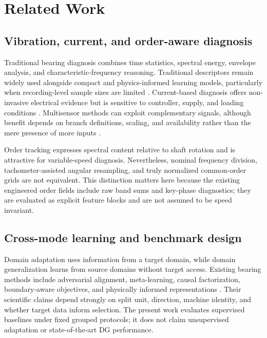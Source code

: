 \documentclass[11pt]{article}
\begin{document}
\section{Related Work}
\subsection{Vibration, current, and order-aware diagnosis}
Traditional bearing diagnosis combines time statistics, spectral energy, envelope analysis, and characteristic-frequency reasoning. Traditional descriptors remain widely used alongside compact and physics-informed learning models, particularly when recording-level sample sizes are limited \cite{Hoang2018DLSurvey,Zhang2017CNNBearing,Ni2023PIResNet,Ruan2023CNNParameter}. Current-based diagnosis offers non-invasive electrical evidence but is sensitive to controller, supply, and loading conditions \cite{Gundewar2020InductionMotorReview,Toma2020MotorCurrentGA,Hoang2019MotorCurrentFusion,Guan2023MotorCurrentCausalConv}. Multisensor methods can exploit complementary signals, although benefit depends on branch definitions, scaling, and availability rather than the mere presence of more inputs \cite{Chen2017MultisensorSAE,Che2020HybridMultimodal,Wang2021ThreeStageFusion,Meng2023GraphAttentionFusion,You2024SoundVibrationPhysics,Xu2024HybridMultimodalFusion}.

Order tracking expresses spectral content relative to shaft rotation and is attractive for variable-speed diagnosis. Nevertheless, nominal frequency division, tachometer-assisted angular resampling, and truly normalized common-order grids are not equivalent. This distinction matters here because the existing engineered order fields include raw band sums and key-phase diagnostics; they are evaluated as explicit feature blocks and are not assumed to be speed invariant.

\subsection{Cross-mode learning and benchmark design}
Domain adaptation uses information from a target domain, while domain generalization learns from source domains without target access. Existing bearing methods include adversarial alignment, meta-learning, causal factorization, boundary-aware objectives, and physically informed representations \cite{Wan2022MultiAdversarialDA,Zhao2021JDAN,Li2021MetaLearningFewShot,Jia2023CausalFactorization,Li2022BoundaryDG,Pang2024FaultVibrationDG,Kim2023SingleDomainPI,Xie2024DualInvariantDG,Cheng2024CausalDG}. Their scientific claims depend strongly on split unit, direction, machine identity, and whether target data inform selection. The present work evaluates supervised baselines under fixed grouped protocols; it does not claim unsupervised adaptation or state-of-the-art DG performance.
\end{document}
